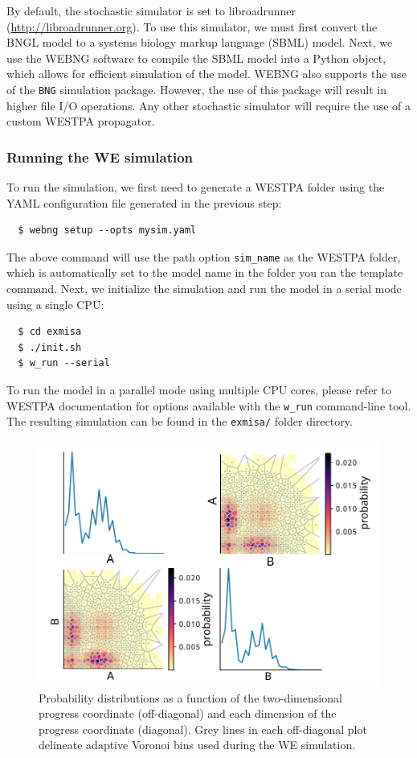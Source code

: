 By default, the stochastic simulator is set to libroadrunner ({\url{http://libroadrunner.org}}). 
To use this simulator, we must first convert the BNGL model to a systems biology markup language (SBML) model. 
Next, we use the WEBNG software to compile the SBML model into a Python object, which allows for efficient simulation of the model. 
WEBNG also supports the use of the \verb|BNG| simulation package. 
However, the use of this package will result in higher file I/O operations. 
Any other stochastic simulator will require the use of a custom WESTPA propagator.

\subsubsection{Running the WE simulation}
To run the simulation, we first need to generate a WESTPA folder using the YAML configuration file generated in the previous step:

\begin{verbatim}
  $ webng setup --opts mysim.yaml
\end{verbatim}

The above command will use the path option \verb|sim_name| as the WESTPA folder, which is automatically set to the model name in the folder you ran the template command. 
Next, we initialize the simulation and run the model in a serial mode using a single CPU: 

\begin{verbatim}
  $ cd exmisa
  $ ./init.sh
  $ w_run --serial
\end{verbatim}

To run the model in a parallel mode using multiple CPU cores, please refer to WESTPA documentation for options available with the \verb|w_run| command-line tool.
The resulting simulation can be found in the \verb|exmisa/| folder directory.

\begin{figure}[t]
\centering
\includegraphics[width=\columnwidth]{figures/Figure14_ProbDist.pdf}
\caption{Probability distributions as a function of the two-dimensional progress coordinate (off-diagonal) and each dimension of the progress coordinate (diagonal).
Grey lines in each off-diagonal plot delineate adaptive Voronoi bins used during the WE simulation.}
\end{figure}

